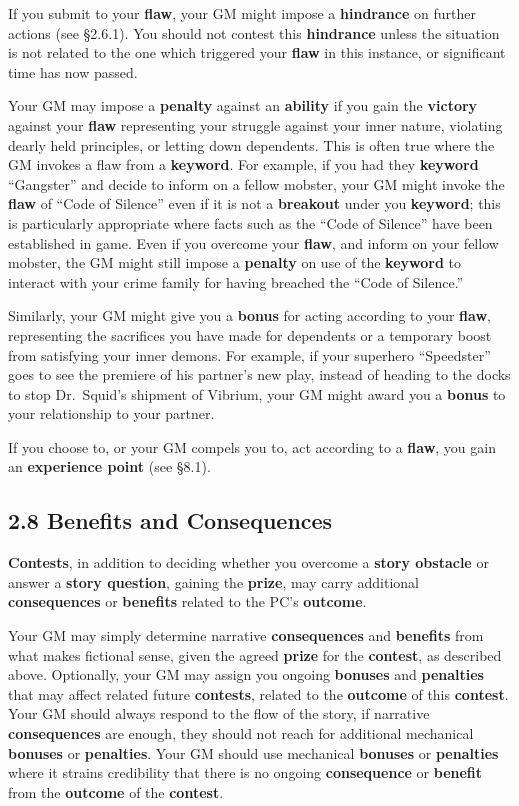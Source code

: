 \documentclass[
  11pt,
]{article}
\begin{document}
If you submit to your \textbf{flaw}, your GM might impose a
\textbf{hindrance} on further actions (see §2.6.1). You should not
contest this \textbf{hindrance} unless the situation is not related to
the one which triggered your \textbf{flaw} in this instance, or
significant time has now passed.

Your GM may impose a \textbf{penalty} against an \textbf{ability} if you
gain the \textbf{victory} against your \textbf{flaw} representing your
struggle against your inner nature, violating dearly held principles, or
letting down dependents. This is often true where the GM invokes a flaw
from a \textbf{keyword}. For example, if you had they \textbf{keyword}
``Gangster'' and decide to inform on a fellow mobster, your GM might
invoke the \textbf{flaw} of ``Code of Silence'' even if it is not a
\textbf{breakout} under you \textbf{keyword}; this is particularly
appropriate where facts such as the ``Code of Silence'' have been
established in game. Even if you overcome your \textbf{flaw}, and inform
on your fellow mobster, the GM might still impose a \textbf{penalty} on
use of the \textbf{keyword} to interact with your crime family for
having breached the ``Code of Silence.''

Similarly, your GM might give you a \textbf{bonus} for acting according
to your \textbf{flaw}, representing the sacrifices you have made for
dependents or a temporary boost from satisfying your inner demons. For
example, if your superhero ``Speedster'' goes to see the premiere of his
partner's new play, instead of heading to the docks to stop Dr.~Squid's
shipment of Vibrium, your GM might award you a \textbf{bonus} to your
relationship to your partner.

If you choose to, or your GM compels you to, act according to a
\textbf{flaw}, you gain an \textbf{experience point} (see §8.1).

\hypertarget{benefits-and-consequences}{%
\subsection{2.8 Benefits and
Consequences}\label{benefits-and-consequences}}

\textbf{Contests}, in addition to deciding whether you overcome a
\textbf{story obstacle} or answer a \textbf{story question}, gaining the
\textbf{prize}, may carry additional \textbf{consequences} or
\textbf{benefits} related to the PC's \textbf{outcome}.

Your GM may simply determine narrative \textbf{consequences} and
\textbf{benefits} from what makes fictional sense, given the agreed
\textbf{prize} for the \textbf{contest}, as described above. Optionally,
your GM may assign you ongoing \textbf{bonuses} and \textbf{penalties}
that may affect related future \textbf{contests}, related to the
\textbf{outcome} of this \textbf{contest}. Your GM should always respond
to the flow of the story, if narrative \textbf{consequences} are enough,
they should not reach for additional mechanical \textbf{bonuses} or
\textbf{penalties}. Your GM should use mechanical \textbf{bonuses} or
\textbf{penalties} where it strains credibility that there is no ongoing
\textbf{consequence} or \textbf{benefit} from the \textbf{outcome} of
the \textbf{contest}.
\end{document}
